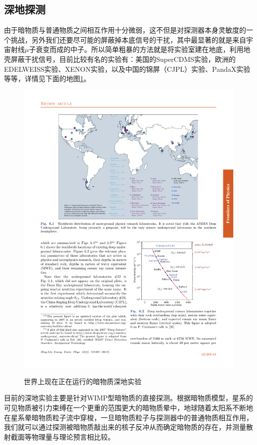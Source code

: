 \documentclass{ctexart}
\begin{document}
	\subsection{深地探测}
	由于暗物质与普通物质之间相互作用十分微弱，这不但是对探测器本身灵敏度的一个挑战，另外我们还要尽可能的屏蔽掉本底信号的干扰，其中最显著的就是来自宇宙射线$\mu$子衰变而成的中子。所以简单粗暴的方法就是将实验室建在地底，利用地壳屏蔽干扰信号，目前比较有名的实验有：美国的SuperCDMS实验，欧洲的EDELWEISS实验、XENON实验，以及中国的锦屏（CJPL）实验、PandaX实验等等，详情见下面的地图\ref{fig:7}。
	\begin{figure}[h]
		\centering
		\includegraphics[width=\linewidth]{figs/fig7.pdf}
		\label{fig:7}
		\caption{世界上现在正在运行的暗物质深地实验}
	\end{figure}
	目前的深地实验主要是针对WIMP型暗物质的直接探测。根据暗物质模型，星系的可见物质被引力束缚在一个更重的范围更大的暗物质晕中，地球随着太阳系不断地在星系晕暗物质粒子流中穿梭，一旦暗物质粒子与探测器中的普通物质相互作用，我们就可以通过探测被暗物质敲出来的核子反冲从而确定暗物质的存在，并测量散射截面等物理量与理论预言相比较。
	
\end{document}
